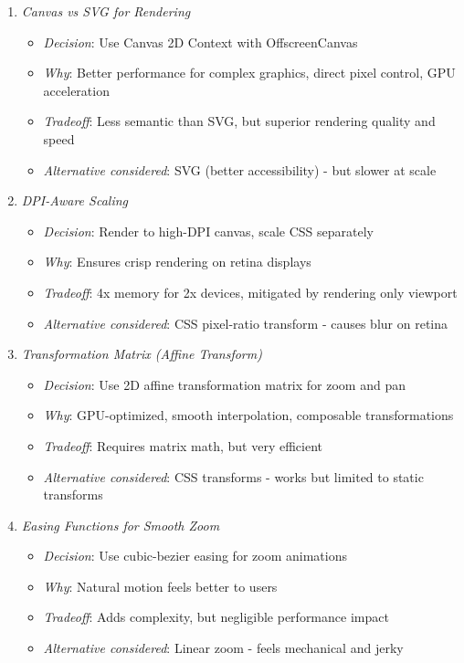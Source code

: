 \documentclass[11pt]{article}
\begin{document}
\begin{enumerate}
\item \emph{Canvas vs SVG for Rendering}

\begin{itemize}
\item \emph{Decision}: Use Canvas 2D Context with OffscreenCanvas
\item \emph{Why}: Better performance for complex graphics, direct pixel control, GPU acceleration
\item \emph{Tradeoff}: Less semantic than SVG, but superior rendering quality and speed
\item \emph{Alternative considered}: SVG (better accessibility) - but slower at scale
\end{itemize}

\item \emph{DPI-Aware Scaling}

\begin{itemize}
\item \emph{Decision}: Render to high-DPI canvas, scale CSS separately
\item \emph{Why}: Ensures crisp rendering on retina displays
\item \emph{Tradeoff}: 4x memory for 2x devices, mitigated by rendering only viewport
\item \emph{Alternative considered}: CSS pixel-ratio transform - causes blur on retina
\end{itemize}

\item \emph{Transformation Matrix (Affine Transform)}

\begin{itemize}
\item \emph{Decision}: Use 2D affine transformation matrix for zoom and pan
\item \emph{Why}: GPU-optimized, smooth interpolation, composable transformations
\item \emph{Tradeoff}: Requires matrix math, but very efficient
\item \emph{Alternative considered}: CSS transforms - works but limited to static transforms
\end{itemize}

\item \emph{Easing Functions for Smooth Zoom}

\begin{itemize}
\item \emph{Decision}: Use cubic-bezier easing for zoom animations
\item \emph{Why}: Natural motion feels better to users
\item \emph{Tradeoff}: Adds complexity, but negligible performance impact
\item \emph{Alternative considered}: Linear zoom - feels mechanical and jerky
\end{itemize}


\end{enumerate}
\end{document}
